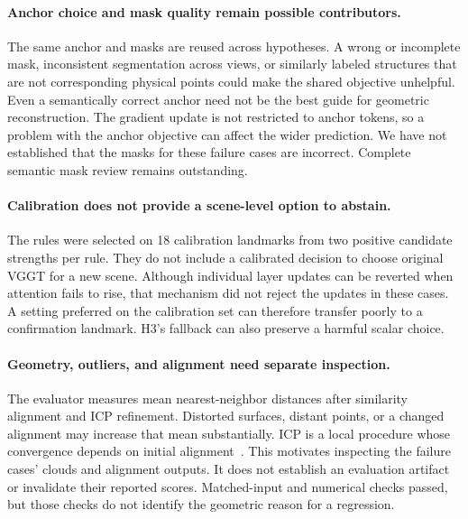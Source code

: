\begin{table}[t]
\caption{Observed failure-case diagnostics. Error is whole-landmark normalized Chamfer distance. Update percentages are the mean applied anchor-masked activation-norm ratios across the 24 layers, not displacement in 3D space. Original VGGT has no steering update. All displayed intervention runs accepted all 24 layers.}
\label{tab:regression-diagnostics}
\centering

\end{table}

\paragraph{Anchor choice and mask quality remain possible contributors.}
The same anchor and masks are reused across hypotheses. A wrong or incomplete mask, inconsistent segmentation across views, or similarly labeled structures that are not corresponding physical points could make the shared objective unhelpful. Even a semantically correct anchor need not be the best guide for geometric reconstruction. The gradient update is not restricted to anchor tokens, so a problem with the anchor objective can affect the wider prediction. We have not established that the masks for these failure cases are incorrect. Complete semantic mask review remains outstanding.

\paragraph{Calibration does not provide a scene-level option to abstain.}
The rules were selected on 18 calibration landmarks from two positive candidate strengths per rule. They do not include a calibrated decision to choose original VGGT for a new scene. Although individual layer updates can be reverted when attention fails to rise, that mechanism did not reject the updates in these cases. A setting preferred on the calibration set can therefore transfer poorly to a confirmation landmark. H3's fallback can also preserve a harmful scalar choice.

\paragraph{Geometry, outliers, and alignment need separate inspection.}
The evaluator measures mean nearest-neighbor distances after similarity alignment and ICP refinement. Distorted surfaces, distant points, or a changed alignment may increase that mean substantially. ICP is a local procedure whose convergence depends on initial alignment~\cite{open3d_icp}. This motivates inspecting the failure cases' clouds and alignment outputs. It does not establish an evaluation artifact or invalidate their reported scores. Matched-input and numerical checks passed, but those checks do not identify the geometric reason for a regression.

